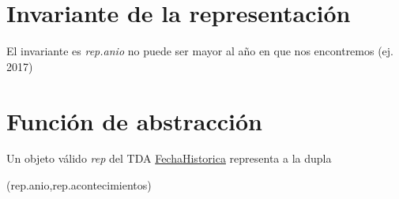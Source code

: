 \hypertarget{repConjunto_invConjunto}{}\section{Invariante de la representación}\label{repConjunto_invConjunto}
El invariante es {\itshape rep.\+anio} no puede ser mayor al año en que nos encontremos (ej. 2017)\hypertarget{repConjunto_faConjunto}{}\section{Función de abstracción}\label{repConjunto_faConjunto}
Un objeto válido {\itshape rep} del T\+DA \hyperlink{classFechaHistorica}{Fecha\+Historica} representa a la dupla

(rep.\+anio,rep.\+acontecimientos) 